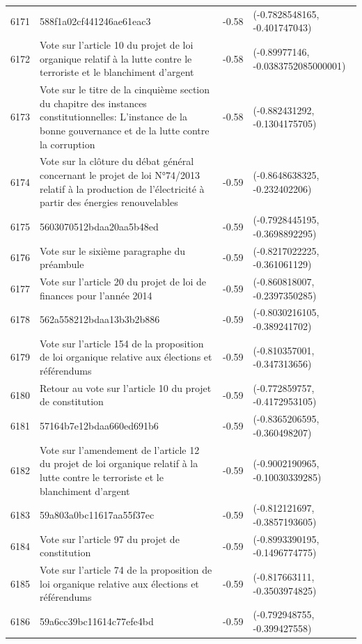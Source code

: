 \begin{table}[ht]
\begin{tabular}{rlrl}
  6171 & 588f1a02cf441246ae61eac3 & -0.58 & (-0.7828548165, -0.401747043) \\ 
  6172 & Vote sur l'article 10 du projet de loi organique relatif à la lutte contre le terroriste et le blanchiment d'argent & -0.58 & (-0.89977146, -0.0383752085000001) \\ 
  6173 & Vote sur le titre de la cinquième section du chapitre des instances constitutionnelles: L'instance de la bonne gouvernance et de la lutte contre la corruption & -0.58 & (-0.882431292, -0.1304175705) \\ 
  6174 & Vote sur la clôture du débat général concernant le projet de loi N°74/2013 relatif à la production de l'électricité à partir des énergies renouvelables & -0.59 & (-0.8648638325, -0.232402206) \\ 
  6175 & 5603070512bdaa20aa5b48ed & -0.59 & (-0.7928445195, -0.3698892295) \\ 
  6176 & Vote sur le sixième paragraphe du préambule & -0.59 & (-0.8217022225, -0.361061129) \\ 
  6177 & Vote sur l'article 20 du projet de loi de finances pour l'année 2014 & -0.59 & (-0.860818007, -0.2397350285) \\ 
  6178 & 562a558212bdaa13b3b2b886 & -0.59 & (-0.8030216105, -0.389241702) \\ 
  6179 & Vote sur l'article 154 de la proposition de loi organique relative aux élections et référendums & -0.59 & (-0.810357001, -0.347313656) \\ 
  6180 & Retour au vote sur l'article 10 du projet de constitution & -0.59 & (-0.772859757, -0.4172953105) \\ 
  6181 & 57164b7e12bdaa660ed691b6 & -0.59 & (-0.8365206595, -0.360498207) \\ 
  6182 & Vote sur l'amendement de l'article 12 du projet de loi organique relatif à la lutte contre le terroriste et le blanchiment d'argent & -0.59 & (-0.9002190965, -0.10030339285) \\ 
  6183 & 59a803a0bc11617aa55f37ec & -0.59 & (-0.812121697, -0.3857193605) \\ 
  6184 & Vote sur l'article 97 du projet de constitution & -0.59 & (-0.8993390195, -0.1496774775) \\ 
  6185 & Vote sur l'article 74 de la proposition de loi organique relative aux élections et référendums & -0.59 & (-0.817663111, -0.3503974825) \\ 
  6186 & 59a6cc39bc11614c77efe4bd & -0.59 & (-0.792948755, -0.399427558) \\ 

\end{tabular}
\end{table}
